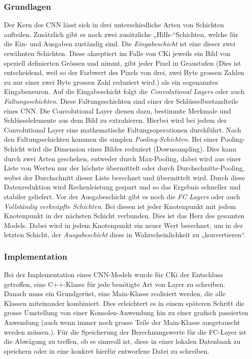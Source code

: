 \subsubsection{Grundlagen}
\label{sec:AnalyseGrundlagen}
Der Kern des CNN lässt sich in drei unterschiedliche Arten von Schichten aufteilen. Zusätzlich gibt es noch zwei zusätzliche „Hilfs-“Schichten, welche für die Ein- und Ausgaben zuständig sind. 
Die \textit{Eingabeschicht} ist eine dieser zwei erwähnten Schichten. Diese akzeptiert im Falle von CKi jeweils ein Bild von speziell definierten Grössen und nimmt, gibt jeder Pixel in Graustufen (Dies ist entscheidend, weil so der Farbwert des Pixels von drei, zwei Byte grossen Zahlen zu nur einer zwei Byte grossen Zahl reduziert wird.) als ein sogenanntes Eingabeneuron. 
Auf die Eingabeschicht folgt die \textit{Convolutional Layers} oder auch \textit{Faltungsschichten}. Diese Faltungsschichten sind einer der Schlüsselbestandteile eines CNN. Die Convolutional Layer dienen dazu, bestimmte Merkmale und Schlüsselelemente aus dem Bild zu extrahieren. Hierbei wird bei jedem der Convolutional Layer eine 
mathematische Faltungsoperationen durchführt. 
Nach den Faltungsschichten kommen die simplen \textit{Pooling-Schichten}. Bei einer Pooling-Schicht wird die Dimension eines Bildes reduziert (Downsampling). Dies kann durch zwei Arten geschehen, entweder durch Max-Pooling, dabei wird aus einer Liste von Werten nur der höchste übermittelt oder durch Durchschnitts-Pooling, wobei der Durchschnitt dieser Liste berechnet und übermittelt wird. Durch diese Datenreduktion wird Rechenleistung gespart und so das Ergebnis schneller und stabiler geliefert. 
Vor der Ausgabeschicht gibt es noch die \textit{FC Layers} oder auch \textit{Vollständig verknüpfte Schichten}. Bei diesen ist jeder Knotenpunkt mit jedem Knotenpunkt in der nächsten Schicht verbunden. Dies ist das Herz des gesamten Models. Dabei wird in jedem Knotenpunkt ein neuer Wert berechnet, um in der letzten Schicht, der \textit{Ausgabeschicht} diese in Wahrscheinlichkeit zu „konvertieren“.

\subsubsection{Implementation}
\label{sec:AnalyseImplementation}
Bei der Implementation eines CNN-Models wurde für CKi der Entschluss getroffen, eine C++-Klasse für jede benötigte Art von Layer zu schreiben. Danach muss ein Grundgerüst, eine Main-Klasse realisiert werden, die alle Klassen miteinander kombiniert. Dies erleichtert es in einem späteren Schritt die grosse Umstellung von einer Konsolen-Anwendung hin zu einer grafisch passierten Anwendung (auch wenn immer noch grosse Teile der Main-Klasse ausgetauscht werden müssen.). Für die Speicherung der Berechnungswerte für die FC-Layer ist die Abwägung zu treffen, ob es sinnvoll ist, diese in einer lokalen Datenbank zu speichern oder in eine konkret hierfür entworfene Datei zu schreiben.

